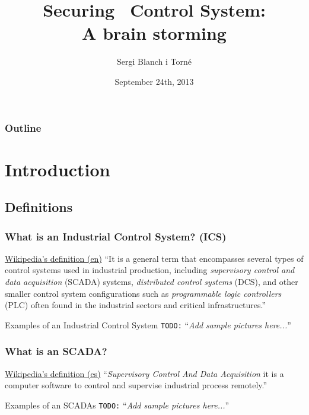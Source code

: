 \documentclass{beamer}
\title[Securing \tango\, Control System]{Securing \tango\, Control System:\\ A brain storming}
\author[Sergi Blanch-Torn\'e]{Sergi Blanch i Torn\'e}
\institute[Universidad de Lleida]{Cryptography \& Graphs\\Math Department\\ Universitat de Lleida}
\date{September 24th, 2013}
\newcommand{\todo}[1]{\texttt{\color{red}TODO:} ``\emph{#1}''}
\begin{document}
\begin{frame}
  \titlepage
\end{frame}

\begin{frame}
\frametitle{Outline}
\tableofcontents[hideallsubsections]
\end{frame}

\section{Introduction}

\subsection{Definitions}

\begin{frame}
\frametitle{What is an Industrial Control System? (ICS)}
    \begin{block}{\href{http://en.wikipedia.org/wiki/Industrial_Control_System}{Wikipedia's definition (en)}}
        ``It is a general term that encompasses several types of control systems used in industrial production, including \emph{supervisory control and data acquisition} (SCADA) systems, \emph{distributed control systems} (DCS), and other smaller control system configurations such as \emph{programmable logic controllers} (PLC) often found in the industrial sectors and critical infrastructures.''
    \end{block}
    \begin{exampleblock}{Examples of an Industrial Control System}
        \todo{Add sample pictures here...}
    \end{exampleblock}
\end{frame}

\begin{frame}
\frametitle{What is an SCADA?}
    \begin{block}{\href{http://es.wikipedia.org/wiki/SCADA}{Wikipedia's definition (es)}}
        ``\emph{Supervisory Control And Data Acquisition} it is a computer software to control and supervise industrial process remotely.''
    \end{block}
    \begin{exampleblock}{Examples of an SCADAs}
        \todo{Add sample pictures here...}
    \end{exampleblock}
\end{frame}
\end{document}
